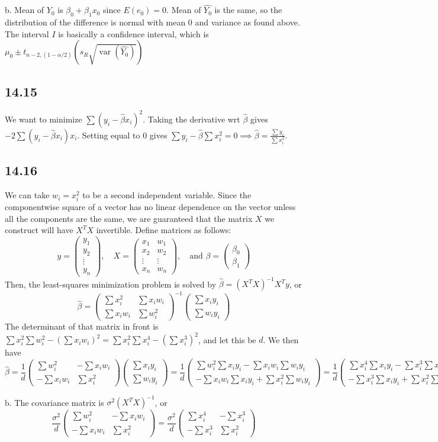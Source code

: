 \documentclass{article}
\newcommand{\openm}{\begin{pmatrix}}
\newcommand{\closem}{\end{pmatrix}}
\DeclareMathOperator{\var}{var}
\begin{document}
\noindent b. Mean of $Y_0$ is $\beta_0+\beta_1x_0$ since $E(e_0)=0$. Mean of $\hat{Y_0}$ is the same, so the distribution of the difference is normal with mean $0$ and variance as found above. The interval $I$ is basically a confidence interval, which is $\mu_0\pm t_{n-2,(1-\alpha/2)}(s_R\sqrt{\var(\hat{Y_0})})$
\subsection*{14.15}
We want to minimize $\sum(y_i-\hat{\beta}x_i)^2$. Taking the derivative wrt $\hat{\beta}$ gives $-2\sum(y_i-\hat{\beta}x_i)x_i$. Setting equal to $0$ gives $\sum y_i-\hat{\beta}\sum x_i^2=0\implies \hat{\beta}=\frac{\sum y_i}{\sum x_i^2}$.
\subsection*{14.16}
We can take $w_i=x_i^2$ to be a second independent variable. Since the componentwise square of a vector has no linear dependence on the vector unless all the components are the same, we are guaranteed that the matrix $X$ we construct will have $X^TX$ invertible. Define matrices as follows:
$$y=\openm y_1\\y_2\\\vdots\\y_n\closem,\quad X=\openm x_1&w_1\\x_2&w_2\\\vdots&\vdots\\x_n&w_n\closem,\quad\text{and }\beta=\openm\beta_0\\\beta_1\closem$$
Then, the least-squares minimization problem is solved by $\hat{\beta}=(X^TX)^{-1}X^Ty$, or
$$\hat{\beta}=\openm\sum x_i^2&\sum x_iw_i\\\sum x_iw_i&\sum w_i^2\closem^{-1}\openm\sum x_iy_i\\\sum w_iy_i\closem$$
The determinant of that matrix in front is $\sum x_i^2\sum w_i^2-(\sum x_iw_i)^2=\sum x_i^2\sum x_i^4-(\sum x_i^3)^2$, and let this be $d$. We then have
$$\hat{\beta}=\frac{1}{d}\openm\sum w_i^2&-\sum x_iw_i\\-\sum x_iw_i&\sum x_i^2\closem\openm\sum x_iy_i\\\sum w_iy_i\closem=\frac{1}{d}\openm\sum w_i^2\sum x_iy_i-\sum x_iw_i\sum w_iy_i\\-\sum x_iw_i\sum x_iy_i+\sum x_i^2\sum w_iy_i\closem=\frac{1}{d}\openm\sum x_i^4\sum x_iy_i-\sum x_i^3\sum x_i^2y_i\\-\sum x_i^3\sum x_iy_i+\sum x_i^2\sum x_i^2y_i\closem$$

\noindent b. The covariance matrix is $\sigma^2(X^TX)^{-1}$, or 
$$\frac{\sigma^2}{d}\openm\sum w_i^2&-\sum x_iw_i\\-\sum x_iw_i&\sum x_i^2\closem=\frac{\sigma^2}{d}\openm\sum x_i^4&-\sum x_i^3\\-\sum x_i^3&\sum x_i^2\closem$$
\end{document}
